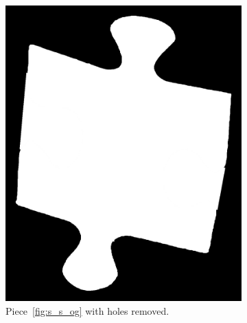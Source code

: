 \documentclass{article}
\begin{document}
\begin{figure}
\begin{subfigure}{0.3\textwidth}
    \includegraphics[width=\linewidth]{pictures/piece_with_no_hole.png}
    \caption{Piece~\cref{fig:s_s_og} with holes removed.}
    \label{fig:s_s_no_holes}
  \end{subfigure}
  \hfill
  \begin{subfigure}{0.3\textwidth}
    \centering

\end{subfigure}
\end{figure}
\end{document}
